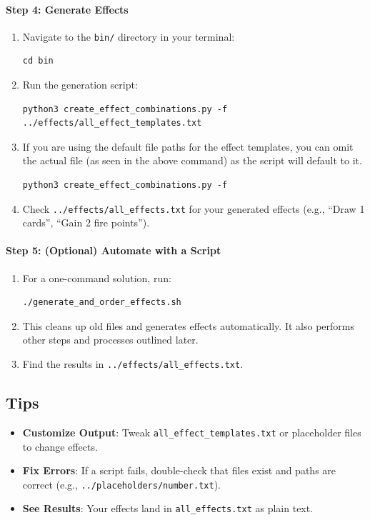 \paragraph{Step 4: Generate Effects}
\begin{enumerate}
	\item Navigate to the \texttt{bin/} directory in your terminal:
\begin{lstlisting}[style=terminalstyle]
cd bin
\end{lstlisting}
	\item Run the generation script:
\begin{lstlisting}[style=terminalstyle]
python3 create_effect_combinations.py -f ../effects/all_effect_templates.txt
\end{lstlisting}
	\item If you are using the default file paths for the effect templates, you can omit the actual file (as seen in the above command) as the script will default to it.
\begin{lstlisting}[style=terminalstyle]
python3 create_effect_combinations.py -f
\end{lstlisting}
	\item Check \texttt{../effects/all\_effects.txt} for your generated effects (e.g., ``Draw 1 cards'', ``Gain 2 fire points'').
\end{enumerate}

\paragraph{Step 5: (Optional) Automate with a Script}
\begin{enumerate}
	\item For a one-command solution, run:
\begin{lstlisting}[style=terminalstyle]
./generate_and_order_effects.sh
\end{lstlisting}
	\item This cleans up old files and generates effects automatically. It also performs other steps and processes outlined later.
	\item Find the results in \texttt{../effects/all\_effects.txt}.
\end{enumerate}

\subsection{Tips}
\begin{itemize}
	\item \textbf{Customize Output}: Tweak \texttt{all\_effect\_templates.txt} or placeholder files to change effects.
	\item \textbf{Fix Errors}: If a script fails, double-check that files exist and paths are correct (e.g., \texttt{../placeholders/number.txt}).
	\item \textbf{See Results}: Your effects land in \texttt{all\_effects.txt} as plain text.
\end{itemize}







